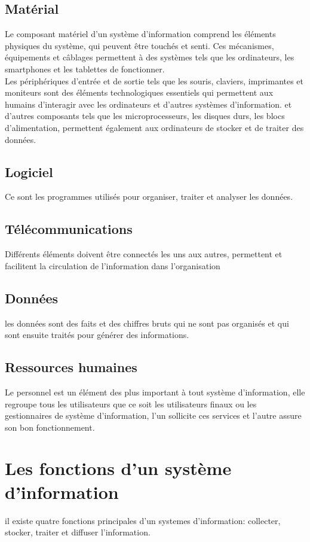 \documentclass[12pt, letterpaper]{article}
\begin{document}
    \subsection{Matérial}
     Le composant matériel d'un système d'information comprend les 
     éléments physiques du système, qui peuvent être touchés et 
     senti. Ces mécanismes, équipements et câblages permettent à 
     des systèmes tels que les ordinateurs, les smartphones et les 
     tablettes de fonctionner.\\
     Les périphériques d'entrée et de sortie tels que les souris, 
     claviers, imprimantes et moniteurs sont des éléments 
     technologiques essentiels qui permettent aux humains d'interagir 
     avec les ordinateurs et d'autres systèmes d'information. et 
     d’autres composants tels que les microprocesseurs, les disques 
     durs, les blocs d'alimentation, permettent également aux 
     ordinateurs de stocker et de traiter des données.
     
     \subsection{Logiciel}
     Ce sont les programmes utilisés pour organiser, traiter et 
     analyser les données.
      
     \subsection{Télécommunications}
     Différents éléments doivent être connectés les uns aux autres, 
     permettent et facilitent la circulation de l’information dans 
     l’organisation
     
     \subsection{Données}
     les données sont des faits et des chiffres bruts qui ne sont pas 
     organisés et qui sont ensuite traités pour générer des informations.
     
     \subsection{Ressources humaines}
     Le personnel est un élément des plus important à tout système 
     d’information, elle regroupe tous les utilisateurs que ce soit les 
     utilisateurs finaux ou les gestionnaires de système d’information, 
     l’un sollicite ces services et l’autre assure son bon fonctionnement.
     
\section{Les fonctions d’un système d’information}
il existe quatre fonctions principales d'un systemes d'information: 
collecter, stocker, traiter et diffuser l’information.
\end{document}
